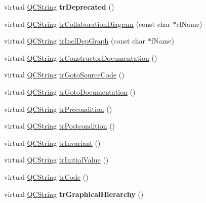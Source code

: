 \begin{DoxyCompactItemize}
virtual \mbox{\hyperlink{class_q_c_string}{Q\+C\+String}} {\bfseries tr\+Deprecated} ()
\item 
virtual \mbox{\hyperlink{class_q_c_string}{Q\+C\+String}} \mbox{\hyperlink{class_translator_vietnamese_abf5be0ae5736253b2850de144ef93787}{tr\+Collaboration\+Diagram}} (const char $\ast$cl\+Name)
\item 
virtual \mbox{\hyperlink{class_q_c_string}{Q\+C\+String}} \mbox{\hyperlink{class_translator_vietnamese_a31f0f3c9fe8f2cb7798b452fe1ae6420}{tr\+Incl\+Dep\+Graph}} (const char $\ast$f\+Name)
\item 
virtual \mbox{\hyperlink{class_q_c_string}{Q\+C\+String}} \mbox{\hyperlink{class_translator_vietnamese_aab3ffec2e43354dbd03571496d4031d3}{tr\+Constructor\+Documentation}} ()
\item 
virtual \mbox{\hyperlink{class_q_c_string}{Q\+C\+String}} \mbox{\hyperlink{class_translator_vietnamese_a312c0c4ab8f55f0e6b39c5b036c80442}{tr\+Goto\+Source\+Code}} ()
\item 
virtual \mbox{\hyperlink{class_q_c_string}{Q\+C\+String}} \mbox{\hyperlink{class_translator_vietnamese_a96368961702c829f0c3d97a35e6ead55}{tr\+Goto\+Documentation}} ()
\item 
virtual \mbox{\hyperlink{class_q_c_string}{Q\+C\+String}} \mbox{\hyperlink{class_translator_vietnamese_a59f792e56029f846a054570019272204}{tr\+Precondition}} ()
\item 
virtual \mbox{\hyperlink{class_q_c_string}{Q\+C\+String}} \mbox{\hyperlink{class_translator_vietnamese_a60b5d7ee59aaecbebb53eca524761057}{tr\+Postcondition}} ()
\item 
virtual \mbox{\hyperlink{class_q_c_string}{Q\+C\+String}} \mbox{\hyperlink{class_translator_vietnamese_a222692fca3bc168b18f4f82a13220d50}{tr\+Invariant}} ()
\item 
virtual \mbox{\hyperlink{class_q_c_string}{Q\+C\+String}} \mbox{\hyperlink{class_translator_vietnamese_ae6838b55e7486e40218a033c02b8b284}{tr\+Initial\+Value}} ()
\item 
virtual \mbox{\hyperlink{class_q_c_string}{Q\+C\+String}} \mbox{\hyperlink{class_translator_vietnamese_af5e1593513ce7aafed1ac2588b362a31}{tr\+Code}} ()
\item 
\mbox{\label{class_translator_vietnamese_ada24396f485e9dd05e76adc721de5ba8}} 
virtual \mbox{\hyperlink{class_q_c_string}{Q\+C\+String}} {\bfseries tr\+Graphical\+Hierarchy} ()
\item 
\mbox{\label{class_translator_vietnamese_a0b2d877fd70da1e59e1b20d058b957a9}} 

\end{DoxyCompactItemize}
